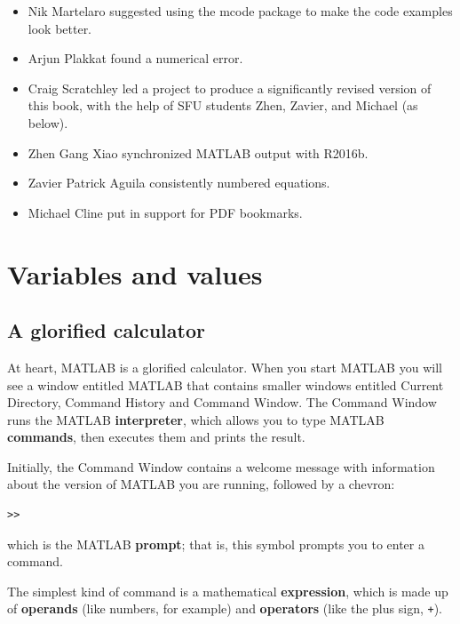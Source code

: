 \documentclass{book}
\begin{document}
\begin{itemize}
\item Nik Martelaro suggested using the mcode package to make the
code examples look better.

\item Arjun Plakkat found a numerical error.

\item Craig Scratchley led a project to produce a significantly
revised version of this book, with the help of SFU students Zhen, Zavier,
and Michael (as below).

\item Zhen Gang Xiao synchronized MATLAB output with R2016b.

\item Zavier Patrick Aguila consistently numbered equations.

\item Michael Cline put in support for PDF bookmarks.

\end{itemize}


\tableofcontents

\mainmatter

\chapter{Variables and values}

\section{A glorified calculator}
\label{calc}

At heart, MATLAB is a glorified calculator.  When you start MATLAB
you will see a window
entitled {\sf MATLAB} that contains smaller windows entitled {\sf
Current Directory}, {\sf Command History} and {\sf Command Window}.
The Command Window runs the MATLAB {\bf interpreter}, which allows you
to type MATLAB {\bf commands}, then executes them and prints the
result.

Initially, the Command Window contains a welcome message with information
about the version of MATLAB you are running, followed by a chevron:

\begin{verbatim}
>>
\end{verbatim}

which is the MATLAB {\bf prompt}; that is, this symbol prompts you
to enter a command.

The simplest kind of command is a mathematical {\bf expression}, which
is made up of {\bf operands} (like numbers, for example) and
{\bf operators} (like the plus sign, {\tt +}).
\end{document}
